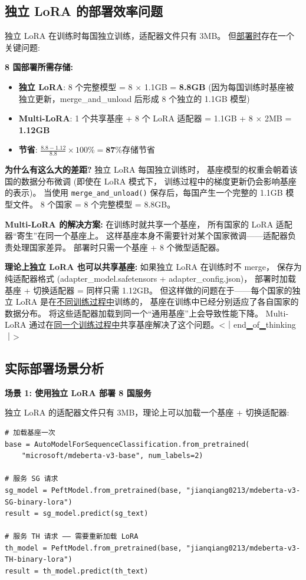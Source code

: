 \documentclass[11pt,a4paper]{article}
\begin{document}
\subsection{独立 LoRA 的部署效率问题}

独立 LoRA 在训练时每国独立训练，适配器文件只有 3MB。
但\underline{部署时}存在一个关键问题:

\textbf{8 国部署所需存储:}
\begin{itemize}
\item \textbf{独立 LoRA}: 8 个完整模型 = 8 $\times$ 1.1GB = \textbf{8.8GB}
  (因为每国训练时基座被独立更新，merge\_and\_unload 后形成 8 个独立的 1.1GB 模型)
\item \textbf{Multi-LoRA}: 1 个共享基座 + 8 个 LoRA 适配器 = 1.1GB + 8 $\times$ 2MB = \textbf{1.12GB}
\item \textbf{节省}: $\frac{8.8 - 1.12}{8.8} \times 100\% = \textbf{87\% 存储节省}$
\end{itemize}

\textbf{为什么有这么大的差距?} 独立 LoRA 每国独立训练时，
基座模型的权重会朝着该国的数据分布微调 (即使在 LoRA 模式下，
训练过程中的梯度更新仍会影响基座的表示)。
当使用 \texttt{merge\_and\_unload()} 保存后，每国产生一个完整的 1.1GB 模型文件。
8 个国家 = 8 个完整模型 = 8.8GB。

\textbf{Multi-LoRA 的解决方案:} 在训练时就共享一个基座，
所有国家的 LoRA 适配器“寄生”在同一个基座上。
这样基座本身不需要针对某个国家微调——适配器负责处理国家差异。
部署时只需一个基座 + 8 个微型适配器。

\textbf{理论上独立 LoRA 也可以共享基座:} 如果独立 LoRA 在训练时不 merge，
保存为纯适配器格式 (adapter\_model.safetensors + adapter\_config.json)，
部署时加载基座 + 切换适配器 = 同样只需 1.12GB。
但这样做的问题在于——每个国家的独立 LoRA 是在\underline{不同训练过程中}训练的，
基座在训练中已经分别适应了各自国家的数据分布。
将这些适配器加载到同一个“通用基座”上会导致性能下降。
Multi-LoRA 通过在\underline{同一个训练过程中}共享基座解决了这个问题。<｜end▁of▁thinking｜>

\subsection{实际部署场景分析}

\textbf{场景 1: 使用独立 LoRA 部署 8 国服务}

独立 LoRA 的适配器文件只有 3MB，理论上可以加载一个基座 + 切换适配器:

\begin{verbatim}
# 加载基座一次
base = AutoModelForSequenceClassification.from_pretrained(
    "microsoft/mdeberta-v3-base", num_labels=2)

# 服务 SG 请求
sg_model = PeftModel.from_pretrained(base, "jianqiang0213/mdeberta-v3-SG-binary-lora")
result = sg_model.predict(sg_text)

# 服务 TH 请求 —— 需要重新加载 LoRA
th_model = PeftModel.from_pretrained(base, "jianqiang0213/mdeberta-v3-TH-binary-lora")
result = th_model.predict(th_text)
\end{verbatim}
\end{document}

